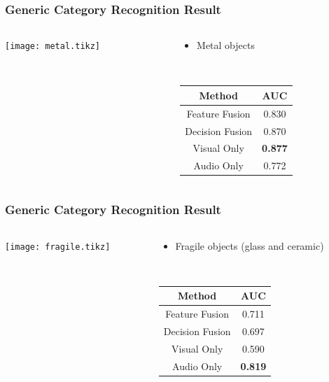 \documentclass[t]{beamer}
\begin{document}
\begin{frame}
  \frametitle{Generic Category Recognition Result}

  \begin{columns}
    \begin{column}{.6\linewidth}
      \centering
      \footnotesize
      \texttt{[image: metal.tikz]}
    \end{column}
    \begin{column}{.4\linewidth}
      \vspace{-1.4\linewidth}
      \begin{itemize}
        \item Metal objects
      \end{itemize}
      ~

      \begin{tabular}[h]{c|c}
        \hline
        Method & AUC \\ \hline \hline
        Feature Fusion & 0.830 \\ \hline
        Decision Fusion  & 0.870 \\ \hline
        Visual Only & \textbf{0.877} \\ \hline
        Audio Only & 0.772 \\ \hline
      \end{tabular}
    \end{column}
  \end{columns}
\end{frame}

\begin{frame}
  \frametitle{Generic Category Recognition Result}

  \begin{columns}
    \begin{column}{.6\linewidth}
      \centering
      \footnotesize
      \texttt{[image: fragile.tikz]}
    \end{column}
    \begin{column}{.4\linewidth}
      \vspace{-1.4\linewidth}
      \begin{itemize}
        \item Fragile objects (glass and ceramic)
      \end{itemize}
      ~

      \begin{tabular}[h]{c|c}
        \hline
        Method & AUC \\ \hline \hline
        Feature Fusion & 0.711 \\ \hline
        Decision Fusion  & 0.697 \\ \hline
        Visual Only & 0.590 \\ \hline
        Audio Only & \textbf{0.819} \\ \hline
      \end{tabular}
    \end{column}
  \end{columns}
\end{frame}
\end{document}

